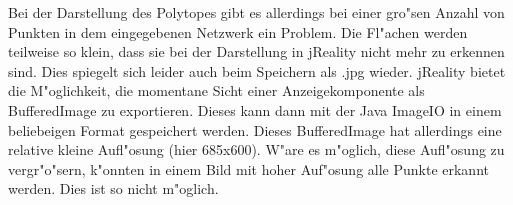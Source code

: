 \documentclass[11pt]{article}
\begin{document}
Bei der Darstellung des Polytopes gibt es allerdings bei einer gro"sen Anzahl von Punkten in dem eingegebenen Netzwerk ein Problem. Die Fl"achen werden teilweise so klein, dass sie bei der Darstellung in jReality nicht mehr zu erkennen sind. Dies spiegelt sich leider auch beim Speichern als .jpg wieder.
jReality bietet die M"oglichkeit, die momentane Sicht einer Anzeigekomponente als BufferedImage zu exportieren. Dieses kann dann mit der Java ImageIO in einem beliebeigen Format gespeichert werden. Dieses BufferedImage hat allerdings eine relative kleine Aufl"osung (hier 685x600). W"are es m"oglich, diese Aufl"osung zu vergr"o"sern, k"onnten in einem Bild mit hoher Auf"osung alle Punkte erkannt werden. Dies ist so nicht m"oglich.
\end{document}
